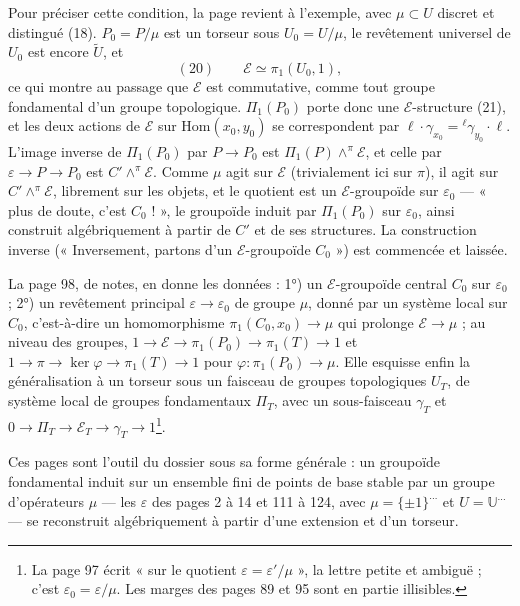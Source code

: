 \documentclass[11pt,a4paper]{article}
\begin{document}
Pour préciser cette condition, la page revient à l'exemple, avec $\mu \subset
U$ discret et distingué (18). $P_0 = P/\mu$ est un torseur sous $U_0 = U/\mu$,
le revêtement universel de $U_0$ est encore $\widetilde{U}$, et
\[
(20)\qquad \mathcal{E} \simeq \pi_1(U_0, 1),
\]
ce qui montre au passage que $\mathcal{E}$ est commutative, comme tout groupe
fondamental d'un groupe topologique. $\Pi_1(P_0)$ porte donc une
$\mathcal{E}$-structure (21), et les deux actions de $\mathcal{E}$ sur
$\mathrm{Hom}(x_0, y_0)$ se correspondent par $\ell\cdot\gamma_{x_0} =
{}^{\ell}\gamma_{y_0} \cdot \ell$. L'image inverse de $\Pi_1(P_0)$ par $P \to
P_0$ est $\Pi_1(P) \wedge^{\pi} \mathcal{E}$, et celle par $\varepsilon \to P
\to P_0$ est $C' \wedge^{\pi} \mathcal{E}$. Comme $\mu$ agit sur
$\mathcal{E}$ (trivialement ici sur $\pi$), il agit sur $C' \wedge^\pi
\mathcal{E}$, librement sur les objets, et le quotient est un
$\mathcal{E}$-groupoïde sur $\varepsilon_0$ — « plus de doute, c'est $C_0$ ! »,
le groupoïde induit par $\Pi_1(P_0)$ sur $\varepsilon_0$, ainsi construit
algébriquement à partir de $C'$ et de ses structures. La construction inverse
(« Inversement, partons d'un $\mathcal{E}$-groupoïde $C_0$ ») est commencée et
laissée.

La page 98, de notes, en donne les données : 1°) un $\mathcal{E}$-groupoïde
central $C_0$ sur $\varepsilon_0$ ; 2°) un revêtement principal $\varepsilon \to
\varepsilon_0$ de groupe $\mu$, donné par un système local sur $C_0$, c'est-à-dire
un homomorphisme $\pi_1(C_0, x_0) \to \mu$ qui prolonge $\mathcal{E} \to \mu$ ;
au niveau des groupes, $1 \to \mathcal{E} \to \pi_1(P_0) \to \pi_1(T) \to 1$ et
$1 \to \pi \to \ker\varphi \to \pi_1(T) \to 1$ pour $\varphi : \pi_1(P_0) \to
\mu$. Elle esquisse enfin la généralisation à un torseur sous un faisceau de
groupes topologiques $U_T$, de système local de groupes fondamentaux
$\Pi_T$, avec un sous-faisceau $\gamma_T$ et $0 \to \Pi_T \to \mathcal{E}_T \to
\gamma_T \to 1$\footnote{La page 97 écrit « sur le quotient $\varepsilon =
\varepsilon'/\mu$ », la lettre petite et ambiguë ; c'est $\varepsilon_0 =
\varepsilon/\mu$. Les marges des pages 89 et 95 sont en partie illisibles.}.

Ces pages sont l'outil du dossier sous sa forme générale : un groupoïde
fondamental induit sur un ensemble fini de points de base stable par un
groupe d'opérateurs $\mu$ — les $\varepsilon$ des pages 2 à 14 et 111 à 124,
avec $\mu = \{\pm1\}^{\ldots}$ et $U = \mathbb{U}^{\ldots}$ — se reconstruit
algébriquement à partir d'une extension et d'un torseur.
\end{document}

